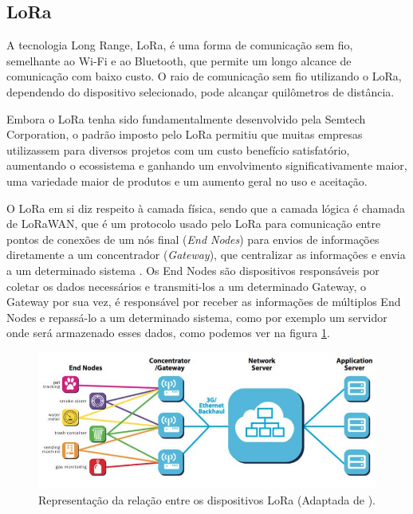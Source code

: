 \subsection{LoRa}
\label{fund:lora}
A tecnologia Long Range, LoRa, é uma forma de comunicação sem fio, semelhante ao Wi-Fi e ao Bluetooth, que permite um longo alcance de comunicação com baixo custo. O raio de comunicação sem fio utilizando o LoRa, dependendo do dispositivo selecionado, pode alcançar quilômetros de distância.

Embora o LoRa tenha sido fundamentalmente desenvolvido pela Semtech Corporation, o padrão imposto pelo LoRa permitiu que muitas empresas utilizassem para diversos projetos com um custo benefício satisfatório, aumentando o ecossistema e ganhando um envolvimento significativamente maior, uma variedade maior de produtos e um aumento geral no uso e aceitação. 

O LoRa em si diz respeito à camada física, sendo que a camada lógica é chamada de LoRaWAN, que é um protocolo usado pelo LoRa para comunicação entre pontos de conexões de um nós final (\textit{End Nodes}) para envios de informações diretamente a um concentrador (\textit{Gateway}), que centralizar as informações e envia a um determinado sistema \cite{lora2021specification}. Os End Nodes são dispositivos responsáveis por coletar os dados necessários e transmiti-los a um determinado Gateway, o Gateway por sua vez, é responsável por receber as informações de múltiplos End Nodes e repassá-lo a um determinado sistema, como por exemplo um servidor onde será armazenado esses dados, como podemos ver na figura \ref{fig:end-nodes-gateways}.

\begin{figure}[H]
  \centering
  \includegraphics[width=.80\textwidth]{assets/lora-network-architecture.png} 
  \caption{Representação da relação entre os dispositivos LoRa (Adaptada de \cite{lora2021architecture}).}
  \label{fig:end-nodes-gateways} 
\end{figure}

